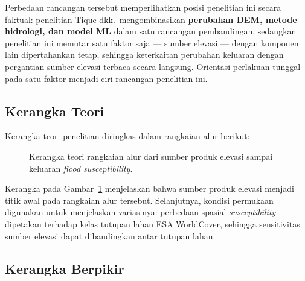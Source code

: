 \documentclass[12pt]{article}
\begin{document}
Perbedaan rancangan tersebut memperlihatkan posisi penelitian ini secara
faktual: penelitian
Tique dkk.\ mengombinasikan \textbf{perubahan DEM, metode hidrologi, dan
model ML} dalam satu rancangan pembandingan, sedangkan penelitian ini
memutar satu faktor saja --- sumber elevasi --- dengan komponen lain
dipertahankan tetap, sehingga keterkaitan perubahan keluaran dengan
pergantian sumber elevasi terbaca secara langsung. Orientasi perlakuan
tunggal pada satu faktor menjadi ciri rancangan penelitian ini.

\subsection{Kerangka Teori}

Kerangka teori penelitian diringkas dalam rangkaian alur berikut:

\begin{figure}[ht]
\centering
{}
\caption{Kerangka teori rangkaian alur dari sumber produk elevasi
sampai keluaran \textit{flood susceptibility}.}
\label{fig:kerangka-teori}
\end{figure}

Kerangka pada Gambar~\ref{fig:kerangka-teori} menjelaskan bahwa sumber
produk elevasi menjadi titik awal pada rangkaian alur tersebut. Selanjutnya,
kondisi permukaan digunakan untuk menjelaskan variasinya: perbedaan
spasial \textit{susceptibility} dipetakan terhadap kelas tutupan lahan ESA
WorldCover, sehingga sensitivitas sumber elevasi dapat dibandingkan antar
tutupan lahan.

\subsection{Kerangka Berpikir}
\end{document}
